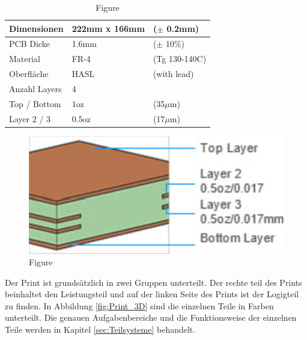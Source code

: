 \begin{table}[H]%
\centering
\parbox{0.5\textwidth}{
\begin{footnotesize}
\begin{tabular}{|l|ll|}
\hline
Dimensionen & 222mm x 166mm & ($\pm$ 0.2mm)\\
\hline
PCB Dicke & 1.6mm & ($\pm$ 10\%)\\
\hline
Material & FR-4 & (Tg 130-140C)\\
\hline
Oberfläche & HASL & (with lead)\\
\hline
Anzahl Layers & 4 & \\
\hline
Top / Bottom & 1oz & (35$\mu$m)\\
\hline
Layer 2 / 3 & 0.5oz & (17$\mu$m)\\
\hline
\end{tabular}
\end{footnotesize}
\caption{Table}
\label{tab:table}
}
\qquad
\begin{minipage}[c]{0.43\textwidth}%
\centering
\begin{figure}[H]
    \includegraphics[width=1\textwidth]{graphics/Print_Layers}
\caption{Figure}
\label{fig:figure}
\end{figure}
\end{minipage}
\end{table}

\newpage

Der Print ist grundsätzlich in zwei Gruppen unterteilt. Der rechte teil des Prints beinhaltet den Leistungsteil und auf der linken Seite des Prints ist der Logigteil zu finden. In Abbildung \ref{fig:Print_3D} sind die einzelnen Teile in Farben unterteilt. Die genauen Aufgabenbereiche und die Funktionsweise der einzelnen Teile werden in Kapitel \ref{sec:Teilsysteme} behandelt.\\


